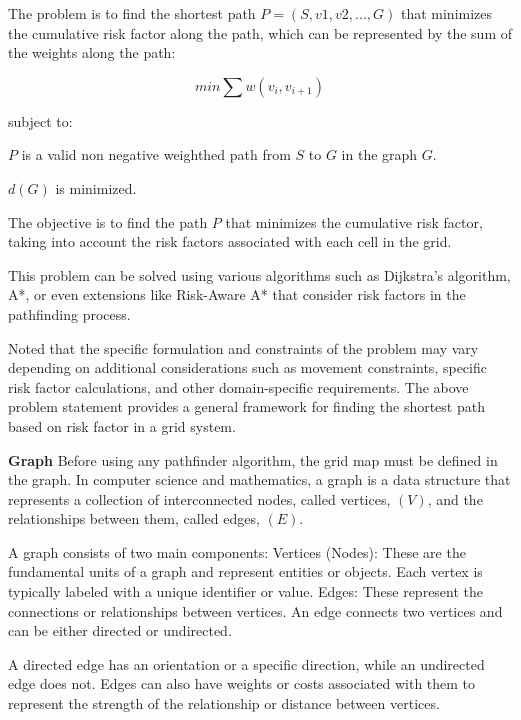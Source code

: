 \documentclass[12pt]{report}
\begin{document}
        The problem is to find the shortest path \(P = (S, v1, v2, . . . , G)\) that minimizes the cumulative risk
        factor along the path, which can be represented by the sum of the weights along the path:

        \begin{equation}\label{eq:weighted_graph}
            min \sum w(v_i,v_{i+1})
        \end{equation}

        subject to:
        \begin{myitemize}
            \item \(P\) is a valid non negative weighthed path from \(S\) to \(G\) in the graph \(G\).
            \item \(d(G)\) is minimized.           
        \end{myitemize}
        The objective is to find the path \(P\) that minimizes the cumulative risk factor, taking into account the risk
        factors associated with each cell in the grid.
            
        This problem can be solved using various algorithms such as Dijkstra's algorithm, A*, or even extensions like
        Risk-Aware A* that consider risk factors in the pathfinding process.
            
        Noted that the specific formulation and constraints of the problem may vary depending on additional
        considerations such as movement constraints, specific risk factor calculations, and other domain-specific
        requirements. The above problem statement provides a general framework for finding the shortest path based on
        risk factor in a grid system.

        \textbf{Graph}
        Before using any pathfinder algorithm, the grid map must be defined in the graph. In computer science and
        mathematics, a graph is a data structure that represents a collection of interconnected nodes, called vertices,
        \((V)\), and the relationships between them, called edges, \((E)\).
            
        A graph consists of two main components: Vertices (Nodes): These are the fundamental units of a graph and
        represent entities or objects. Each vertex is typically labeled with a unique identifier or value. Edges: These
        represent the connections or relationships between vertices. An edge connects two vertices and can be either
        directed or undirected.
            
        A directed edge has an orientation or a specific direction, while an undirected edge does not. Edges can also
        have weights or costs associated with them to represent the strength of the relationship or distance between
        vertices.
            
\end{document}
